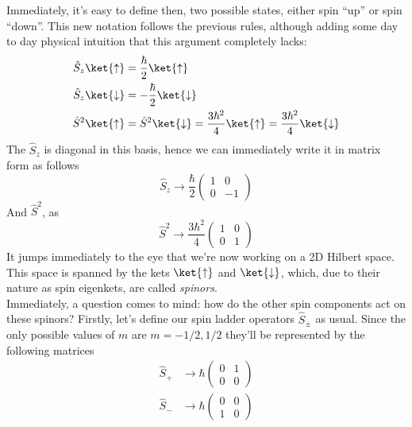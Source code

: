\documentclass[a4paper, 11pt]{book}
\newcommand{\1}{\opr{\mathds{1}}}
\newcommand{\opr}[1]{\hat{#1}}
\newcommand{\ladopru}[1]{\opr{#1}_{+}}
\newcommand{\ladoprd}[1]{\opr{#1}_{-}}
\newcommand{\ladoprpm}[1]{\opr{#1}_{\pm}}
\newcommand{\up}{\uparrow}
\newcommand{\down}{\downarrow}
\theoremstyle{plain}
\begin{document}
	Immediately, it's easy to define then, two possible states, either spin ``up'' or spin ``down''. This new notation follows the previous rules, although adding some day to day physical intuition that this argument completely lacks:
	\begin{equation}
		\begin{aligned}
			\opr{S}_z\ket{\up}&=\frac{\hbar}{2}\ket{\up}\\
			\opr{S}_z\ket{\down}&=-\frac{\hbar}{2}\ket{\down}\\
			\opr{S}^2\ket{\up}&=\opr{S}^2\ket{\down}=\frac{3\hbar^2}{4}\ket{\up}=\frac{3\hbar^2}{4}\ket{\down}
		\end{aligned}
		\label{eq:szupdown}
	\end{equation}
	The $\opr{S}_z$ is diagonal in this basis, hence we can immediately write it in matrix form as follows
	\begin{equation}
		\opr{S}_z\to\frac{\hbar}{2}\begin{pmatrix}
			1&0\\
			0&-1
		\end{pmatrix}
		\label{eq:sigmazetamatrix}
	\end{equation}
	And $\opr{S}^2$, as
	\begin{equation}
		\opr{S}^2\to\frac{3\hbar^2}{4}\begin{pmatrix}
			1&0\\
			0&1
		\end{pmatrix}
		\label{eq:ssqupdown}
	\end{equation}
	It jumps immediately to the eye that we're now working on a 2D Hilbert space. This space is spanned by the kets $\ket{\up}$ and $\ket{\down}$, which, due to their nature as spin eigenkets, are called \textit{spinors}.\\
	Immediately, a question comes to mind: how do the other spin components act on these spinors? Firstly, let's define our spin ladder operators $\ladoprpm{S}$ as usual. Since the only possible values of $m$ are $m=-1/2,1/2$ they'll be represented by the following matrices
	\begin{equation}
		\begin{aligned}
			\ladopru{S}&\to\hbar\begin{pmatrix}
				0&1\\
				0&0
			\end{pmatrix}\\
			\ladoprd{S}&\to\hbar\begin{pmatrix}
				0&0\\
				1&0
			\end{pmatrix}
		\end{aligned}
		\label{eq:spsmmatrix}
	\end{equation}
\end{document}
